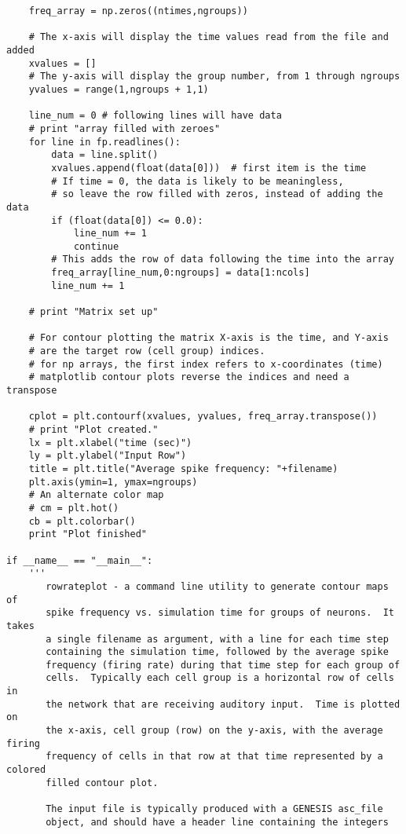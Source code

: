 \documentclass[12pt]{article}
\begin{document}
\begin{verbatim}
    freq_array = np.zeros((ntimes,ngroups))

    # The x-axis will display the time values read from the file and added
    xvalues = []
    # The y-axis will display the group number, from 1 through ngroups
    yvalues = range(1,ngroups + 1,1)

    line_num = 0 # following lines will have data
    # print "array filled with zeroes"
    for line in fp.readlines():
        data = line.split()
        xvalues.append(float(data[0]))  # first item is the time
        # If time = 0, the data is likely to be meaningless,
        # so leave the row filled with zeros, instead of adding the data
        if (float(data[0]) <= 0.0):
            line_num += 1
            continue
        # This adds the row of data following the time into the array
        freq_array[line_num,0:ngroups] = data[1:ncols]
        line_num += 1

    # print "Matrix set up"

    # For contour plotting the matrix X-axis is the time, and Y-axis
    # are the target row (cell group) indices.
    # for np arrays, the first index refers to x-coordinates (time)
    # matplotlib contour plots reverse the indices and need a transpose

    cplot = plt.contourf(xvalues, yvalues, freq_array.transpose())
    # print "Plot created."
    lx = plt.xlabel("time (sec)")
    ly = plt.ylabel("Input Row")
    title = plt.title("Average spike frequency: "+filename)
    plt.axis(ymin=1, ymax=ngroups)
    # An alternate color map
    # cm = plt.hot()
    cb = plt.colorbar()
    print "Plot finished"

if __name__ == "__main__":
    '''
       rowrateplot - a command line utility to generate contour maps of
       spike frequency vs. simulation time for groups of neurons.  It takes
       a single filename as argument, with a line for each time step
       containing the simulation time, followed by the average spike
       frequency (firing rate) during that time step for each group of
       cells.  Typically each cell group is a horizontal row of cells in
       the network that are receiving auditory input.  Time is plotted on
       the x-axis, cell group (row) on the y-axis, with the average firing
       frequency of cells in that row at that time represented by a colored
       filled contour plot.

       The input file is typically produced with a GENESIS asc_file
       object, and should have a header line containing the integers


\end{verbatim}
\end{document}
